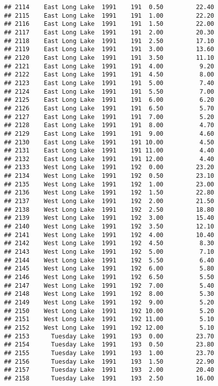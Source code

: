 \documentclass[
]{article}
\begin{document}
\begin{verbatim}
## 2114    East Long Lake  1991    191  0.50         22.40
## 2115    East Long Lake  1991    191  1.00         22.20
## 2116    East Long Lake  1991    191  1.50         22.00
## 2117    East Long Lake  1991    191  2.00         20.30
## 2118    East Long Lake  1991    191  2.50         17.10
## 2119    East Long Lake  1991    191  3.00         13.60
## 2120    East Long Lake  1991    191  3.50         11.10
## 2121    East Long Lake  1991    191  4.00          9.20
## 2122    East Long Lake  1991    191  4.50          8.00
## 2123    East Long Lake  1991    191  5.00          7.40
## 2124    East Long Lake  1991    191  5.50          7.00
## 2125    East Long Lake  1991    191  6.00          6.20
## 2126    East Long Lake  1991    191  6.50          5.70
## 2127    East Long Lake  1991    191  7.00          5.20
## 2128    East Long Lake  1991    191  8.00          4.70
## 2129    East Long Lake  1991    191  9.00          4.60
## 2130    East Long Lake  1991    191 10.00          4.50
## 2131    East Long Lake  1991    191 11.00          4.40
## 2132    East Long Lake  1991    191 12.00          4.40
## 2133    West Long Lake  1991    192  0.00         23.20
## 2134    West Long Lake  1991    192  0.50         23.10
## 2135    West Long Lake  1991    192  1.00         23.00
## 2136    West Long Lake  1991    192  1.50         22.80
## 2137    West Long Lake  1991    192  2.00         21.50
## 2138    West Long Lake  1991    192  2.50         18.80
## 2139    West Long Lake  1991    192  3.00         15.40
## 2140    West Long Lake  1991    192  3.50         12.10
## 2141    West Long Lake  1991    192  4.00         10.40
## 2142    West Long Lake  1991    192  4.50          8.30
## 2143    West Long Lake  1991    192  5.00          7.10
## 2144    West Long Lake  1991    192  5.50          6.40
## 2145    West Long Lake  1991    192  6.00          5.80
## 2146    West Long Lake  1991    192  6.50          5.50
## 2147    West Long Lake  1991    192  7.00          5.40
## 2148    West Long Lake  1991    192  8.00          5.30
## 2149    West Long Lake  1991    192  9.00          5.20
## 2150    West Long Lake  1991    192 10.00          5.20
## 2151    West Long Lake  1991    192 11.00          5.10
## 2152    West Long Lake  1991    192 12.00          5.10
## 2153      Tuesday Lake  1991    193  0.00         23.70
## 2154      Tuesday Lake  1991    193  0.50         23.80
## 2155      Tuesday Lake  1991    193  1.00         23.70
## 2156      Tuesday Lake  1991    193  1.50         22.90
## 2157      Tuesday Lake  1991    193  2.00         20.40
## 2158      Tuesday Lake  1991    193  2.50         16.00

\end{verbatim}
\end{document}
